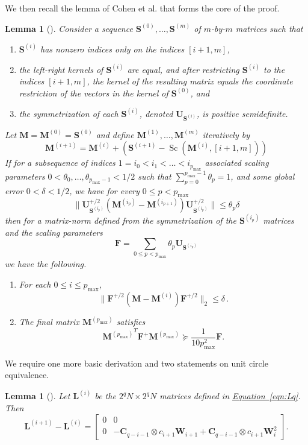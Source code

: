 \documentclass[11pt]{article}
\numberwithin{equation}{section}
\newtheorem{lemma}[theorem]{Lemma}
\theoremstyle{definition}
\theoremstyle{plain}
\newcommand{\expeqref}[2]{\hyperref[#2]{#1~\eqref{#2}}}
\newcommand{\mC}{\mathbf{C}}
\newcommand{\mM}{\mathbf{M}}
\newcommand{\mU}{\mathbf{U}}
\newcommand{\mS}{\mathbf{S}}
\newcommand{\mF}{\mathbf{F}}
\newcommand{\mW}{\mathbf{W}}
\newcommand{\mL}{\mathbf{L}}
\newcommand{\sym}[1][ ]{\mU_{#1}}
\DeclareMathOperator{\Sc}{Sc}
\begin{document}
\noindent
We then recall the lemma of Cohen et al. \cite{CKKPPRS18} %
that forms the core of the 
proof. %
%
%
%
\begin{lemma}[{\cite[Lemma 2.3]{CKKPPRS18}}]  %
\label{app:sc}
  Consider a sequence
%
%
$\mS^{(0)},\ldots,\mS^{(m)}$
of $m$-by-$m$ matrices %
such that  %
%
%
%
\begin{enumerate}
    \item $\mS^{(i)}$ has nonzero indices only on the indices $[i+1,m]$,
    \item the left-right kernels of $\mS^{(i)}$ are equal, and after restricting $\mS^{(i)}$ to the indices $[i+1,m]$, the kernel of the resulting matrix equals the coordinate restriction of the vectors in the kernel of $\mS^{(0)}$, and  %
    \item the symmetrization of each $\mS^{(i)}$, denoted $\sym[\mS^{(i)}]$, is positive
%
semidefinite.  %
\end{enumerate}
Let $\mM=\mM^{(0)}=\mS^{(0)}$ and define $\mM^{(1)},\ldots, \mM^{(m)}$ iteratively by
$$\mM^{(i+1)} = \mM^{(i)} + (\mS^{(i+1)} - \Sc(\mM^{(i)},[i+1,m]))$$
If for a subsequence of indices $1 =i_0<i_1<\ldots<  i_{p_{\max}}$ associated scaling parameters $0< \theta_0,\ldots,\theta_{p_{\max}-1}<1/2$ such that $\sum_{p=0}^{p_{\max}-1}\theta_p=1$, and some global error $0< \delta <1/2$, we have for 
every $0\leq p < p_{\max}$ %
$$\|\sym[\mS^{(i_p)}]^{+/2}(\mM^{(i_p)}-\mM^{(i_{p+1})})\sym[\mS^{(i_p)}]^{+/2}\| \leq \theta_p\delta$$
then for a matrix-norm defined from the symmetrization of the $\mS^{(i_p)}$ matrices and the scaling parameters
$$\mF = \sum_{0\leq p<p_{\max}}\theta_p \sym[\mS^{(i_p)}]$$
we have the following.  %
\begin{enumerate}
    \item For each $0\leq i\leq p_{\max}$,
    $$\|\mF^{+/2}(\mM-\mM^{(i)})\mF^{+/2}\|_2 \leq \delta\,.$$
    \item The final matrix $\mM^{(p_{\max})}$ satisfies
    $${\mM^{(p_{\max})}}^T\mF^+\mM^{(p_{\max})}\succeq \frac{1}{10p^2_{\max}}\mF.$$
\end{enumerate}
\end{lemma}

We require one more basic derivation and two statements on unit circle equivalence.
%
\begin{lemma}[{\cite[Lemma D.2]{AhmadinejadKeMuPeSiVa19}}] %
\label{app:diff}
Let $\mL^{(i)}$ be the $2^qN\times 2^qN$ matrices defined in  \expeqref{Equation}{eqn:Lq}. Then
$$\mL^{(i+1)}-\mL^{(i)} = \begin{bmatrix} 0 & 0\\ 0 & -\mC_{q-i-1}\otimes c_{i+1}\mW_{i+1}+\mC_{q-i-1}\otimes c_{i+1}\mW_{i}^2\end{bmatrix}.$$
\end{lemma}
\end{document}
